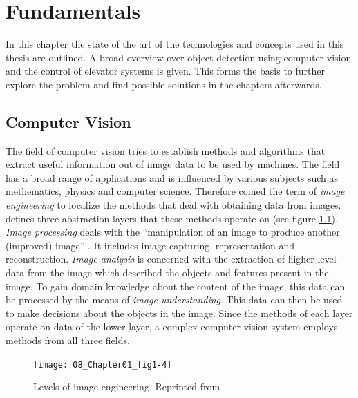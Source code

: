 \chapter{Fundamentals}
\label{chap:sota}
In this chapter the state of the art of the technologies and concepts used in this thesis are outlined.
A broad overview over object detection using computer vision and the control of elevator systems is given.
This forms the basis to further explore the problem and find possible solutions in the chapters afterwards.

\section{Computer Vision}

The field of computer vision tries to establish methods and algorithms 
that extract useful information out of image data to be used by machines. 
The field has a broad range of applications and is influenced by various subjects such as methematics, physics and computer science.
Therefore \textcite{zhang2017imageprocessing} coined the term of \emph{image engineering} to localize the methods that deal with obtaining data from images. 
\textcite{zhang2017imageprocessing} defines three abstraction layers that these methods operate on (see figure \ref{fig:sota:imageengineering}).
\emph{Image processing} deals with the \enquote{manipulation of an image to produce another (improved) image} \autocite[][]{zhang2017imageprocessing}. 
It includes image capturing, representation and reconstruction.
\emph{Image analysis} is concerned with the extraction of higher level data from the image which described the objects and features present in the image.
To gain domain knowledge about the content of the image, this data can be processed by the means of \emph{image understanding}. 
This data can then be used to make decisions about the objects in the image.
Since the methods of each layer operate on data of the lower layer, a complex computer vision system employs methods from all three fields.  

\begin{figure}[hbt]
	\centering
	\texttt{[image: 08\_Chapter01\_fig1-4]}
	\caption{\label{fig:sota:imageengineering} Levels of image engineering. 
	Reprinted from \textcite[][Chapter~1]{zhang2017imageprocessing}}
\end{figure}

